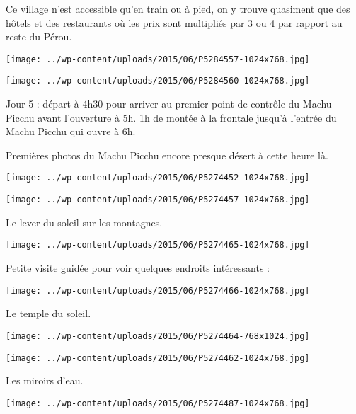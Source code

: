 Ce village n'est accessible qu'en train ou à pied, on y trouve quasiment que des hôtels et des restaurants où les prix sont multipliés par 3 ou 4 par rapport au reste du Pérou. 
\begin{center} \texttt{[image: ../wp-content/uploads/2015/06/P5284557-1024x768.jpg]} \end{center}
\begin{center} \texttt{[image: ../wp-content/uploads/2015/06/P5284560-1024x768.jpg]} \end{center}

Jour 5 : départ à 4h30 pour arriver au premier point de contrôle du Machu Picchu avant l'ouverture à 5h.  1h de montée à la frontale jusqu'à l'entrée du Machu Picchu qui ouvre à 6h. 
 
Premières photos du Machu Picchu encore presque désert à cette heure là. 
\begin{center} \texttt{[image: ../wp-content/uploads/2015/06/P5274452-1024x768.jpg]} \end{center}
\begin{center} \texttt{[image: ../wp-content/uploads/2015/06/P5274457-1024x768.jpg]} \end{center}

Le lever du soleil sur les montagnes. 
\begin{center} \texttt{[image: ../wp-content/uploads/2015/06/P5274465-1024x768.jpg]} \end{center}
\pagebreak

Petite visite guidée pour voir quelques endroits intéressants : 
\begin{center} \texttt{[image: ../wp-content/uploads/2015/06/P5274466-1024x768.jpg]} \end{center}

Le temple du soleil. 
\begin{center} \texttt{[image: ../wp-content/uploads/2015/06/P5274464-768x1024.jpg]} \end{center}

\begin{center} \texttt{[image: ../wp-content/uploads/2015/06/P5274462-1024x768.jpg]} \end{center}

Les miroirs d'eau. 
\begin{center} \texttt{[image: ../wp-content/uploads/2015/06/P5274487-1024x768.jpg]} \end{center}
\pagebreak

